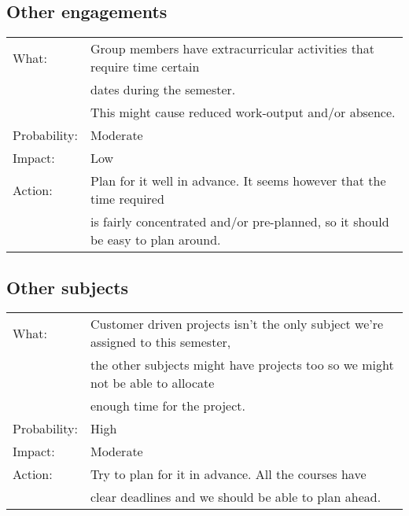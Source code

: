 \documentclass[12pt, a4paper]{article}
\begin{document}
\subsection{Other engagements}
\begin{tabular}{| l | l |}
	\hline
	What: & Group members have extracurricular activities that require time certain\\
	 & dates during the semester.\\
	 & This might cause reduced work-output and/or absence.\\
	\hline
	Probability: & Moderate \\
	\hline
	Impact: & Low \\
	\hline
	Action: & Plan for it well in advance. It seems however that the time required\\
	& is fairly concentrated and/or pre-planned, so it should be easy to plan around.\\
	\hline

\end{tabular}

\subsection{Other subjects}
\begin{tabular}{| l | l |}
	\hline
	What: & Customer driven projects isn't the only subject we're assigned to this semester,\\
	& the other subjects might have projects too so we might not be able to allocate\\
	& enough time for the project.\\
	\hline
	Probability: & High \\
	\hline
	Impact: & Moderate \\
	\hline
	Action: & Try to plan for it in advance. All the courses have\\
	 & clear deadlines and we should be able to plan ahead.\\
	\hline

\end{tabular}
\end{document}
